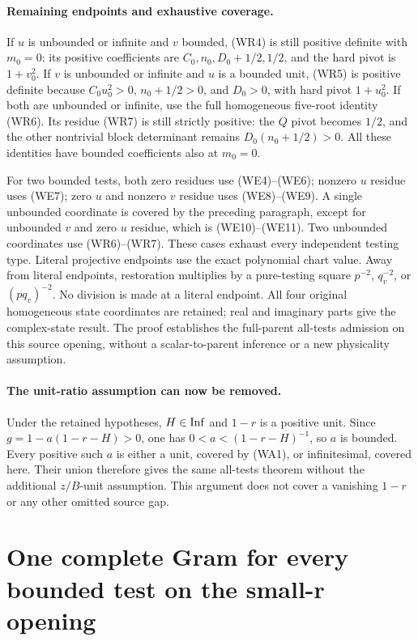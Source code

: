 \paragraph{Remaining endpoints and exhaustive coverage.}
If $u$ is unbounded or infinite and $v$ bounded, (WR4) is still
positive definite with $m_0=0$: its positive coefficients are
$C_0,n_0,D_0+1/2,1/2$, and the hard pivot is $1+v_0^2$.
If $v$ is unbounded or infinite and $u$ is a bounded unit,
(WR5) is positive definite because $C_0u_0^2>0$,
$n_0+1/2>0$, and $D_0>0$, with hard pivot $1+u_0^2$.
If both are unbounded or infinite, use the full homogeneous
five-root identity (WR6). Its residue (WR7) is still strictly
positive: the $Q$ pivot becomes $1/2$, and the other nontrivial
block determinant remains $D_0(n_0+1/2)>0$.
All these identities have bounded coefficients also at $m_0=0$.

For two bounded tests, both zero residues use (WE4)--(WE6);
nonzero $u$ residue uses (WE7); zero $u$ and nonzero $v$ residue
uses (WE8)--(WE9). A single unbounded coordinate is covered by
the preceding paragraph, except for unbounded $v$ and zero $u$
residue, which is (WE10)--(WE11). Two unbounded coordinates use
(WR6)--(WR7). These cases exhaust every independent testing type.
Literal projective endpoints use the exact polynomial chart value.
Away from literal endpoints, restoration multiplies by a
pure-testing square $p^{-2}$, $q_v^{-2}$, or $(pq_v)^{-2}$.
No division is made at a literal endpoint. All four original
homogeneous state coordinates are retained; real and imaginary
parts give the complex-state result. The proof establishes the
full-parent all-tests admission on this source opening, without
a scalar-to-parent inference or a new physicality assumption.

\paragraph{The unit-ratio assumption can now be removed.}
Under the retained hypotheses, $H\in\operatorname{Inf}$ and $1-r$ is a
positive unit. Since $g=1-a(1-r-H)>0$, one has
$0<a<(1-r-H)^{-1}$, so $a$ is bounded. Every positive such
$a$ is either a unit, covered by (WA1), or infinitesimal, covered
here. Their union therefore gives the same all-tests theorem
without the additional $z/B$-unit assumption. This argument does
not cover a vanishing $1-r$ or any other omitted source gap.


\section{\texorpdfstring{One complete Gram for every bounded test on the small-r opening}{One complete Gram for every bounded test on the small-r opening}}
\label{component:p99372d145f17}

